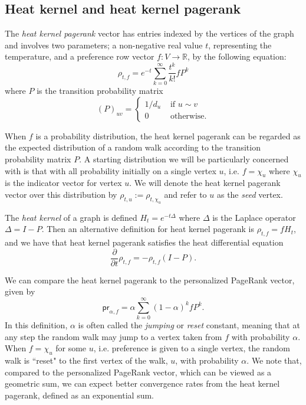 \documentclass[runningheads,a4paper]{llncs}
\newcommand{\R}{\mathbb{R}}
\newcommand{\pr}{\textsf{pr}}
\begin{document}
\subsection{Heat kernel and heat kernel pagerank}
\label{sec:heatkernelandhkpr}
The \emph{heat kernel pagerank} vector has entries indexed by the vertices of
the graph and involves two parameters; a non-negative real value $t$,
representing the temperature, and a preference row vector $f: V \rightarrow \R$,
by the following equation:
\begin{equation}\label{eq:hkpr}
\rho_{t,f} = e^{-t} \sum\limits_{k=0}^{\infty} \frac{t^k}{k!}fP^k
\end{equation}
where $P$ is the transition probability matrix
\begin{equation*}
(P)_{uv} =
\begin{cases}
1/d_u & \mbox{ if } u\sim v\\
0 & \mbox{ otherwise}.
\end{cases}
\end{equation*}

When $f$ is a probability distribution, the heat kernel pagerank can be regarded
as the expected distribution of a random walk according to the transition
probability matrix $P$.  A starting distribution we will be particularly
concerned with is that with all probability initially on a single vertex $u$,
i.e. $f = \chi_u$ where $\chi_u$ is the indicator vector for vertex $u$.  We
will denote the heat kernel pagerank vector over this distribution by $\rho_{t,u} :=
\rho_{t,\chi_u}$ and refer to $u$ as the \emph{seed} vertex.

The \emph{heat kernel} of a graph is defined $H_t = e^{-t\Delta}$ where $\Delta$
is the Laplace operator $\Delta = I - P$.  Then an alternative definition for
heat kernel pagerank is $\rho_{t,f} = fH_t$, and we have that heat kernel pagerank
satisfies the heat differential equation
\begin{equation}\label{eq:heateq}
\frac{\partial}{\partial t}\rho_{t,f} = -\rho_{t,f}(I-P).
\end{equation}

We can compare the heat kernel pagerank to the personalized PageRank vector,
given by
\begin{equation}\label{eq:pagerank}
\pr_{\alpha, f} = \alpha \sum\limits_{k=0}^{\infty}(1-\alpha)^kfP^k.
\end{equation}
In this definition, $\alpha$ is often called the \emph{jumping} or \emph{reset}
constant, meaning that at any step the random walk may jump to a vertex taken
from $f$ with probability $\alpha$.  When $f = \chi_u$ for some $u$, i.e.
preference is given to a single vertex, the random walk is ``reset" to the first
vertex of the walk, $u$, with probability $\alpha$.  We note that, compared to
the personalized PageRank vector, which can be viewed as a geometric sum, we can
expect better convergence rates from the heat kernel pagerank, defined as an
exponential sum.
\end{document}

